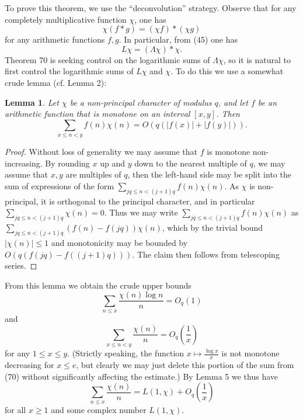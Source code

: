 \documentclass[10pt,reqno]{amsart}
\newtheorem{lemma}[theorem]{Lemma}
\begin{document}
To prove this theorem, we use the “deconvolution” strategy. Observe that for any completely multiplicative function $\chi$, one has
%
\[  \chi(f*g) = (\chi f) * (\chi g)\]
%
for any arithmetic functions $f, g$. In particular, from (45) one has
%
\begin{equation}   L\chi = (\Lambda \chi) * \chi. \end{equation}
%
Theorem 70 is seeking control on the logarithmic sums of $\Lambda \chi$, so it is natural to first control the logarithmic sums of $L\chi$ and $\chi$. To do this we use a somewhat crude lemma (cf. Lemma 2):

\begin{lemma}
    Let $\chi$ be a non-principal character of modulus $q$, and let $f$ be an arithmetic function that is monotone on an interval $[x,y]$. Then
    \[  \sum_{x \leq n < y} f(n) \chi(n) = O( q(|f(x)| + |f(y)|) ).\]
\end{lemma}
\begin{proof}
    Without loss of generality we may assume that $f$ is monotone non-increasing. By rounding $x$ up and $y$ down to the nearest multiple of $q$, we may assume that $x, y$ are multiples of $q$, then the left-hand side may be split into the sum of expressions of the form $\sum_{jq \leq n < (j+1)q} f(n) \chi(n)$. As $\chi$ is non-principal, it is orthogonal to the principal character, and in particular $\sum_{jq \leq n < (j+1) q} \chi(n) = 0$. Thus we may write $\sum_{jq \leq n < (j+1)q} f(n) \chi(n)$ as $\sum_{jq \leq n < (j+1)q} (f(n)-f(jq)) \chi(n)$, which by the trivial bound $|\chi(n)| \leq 1$ and monotonicity may be bounded by $O( q(f(jq) - f((j+1)q)) )$. The claim then follows from telescoping series. %
\end{proof}

From this lemma we obtain the crude upper bounds
%
\begin{equation}   \sum_{n \leq x} \frac{\chi(n) \log n}{n} = O_q( 1 ) \end{equation}
%
and
%
\begin{equation}   \sum_{x \leq n < y} \frac{\chi(n)}{n} = O_q \left( \frac{1}{x} \right) \end{equation}
%
for any $1 \leq x \leq y$. (Strictly speaking, the function $x \mapsto \frac{\log x}{x}$ is not monotone decreasing for $x \leq e$, but clearly we may just delete this portion of the sum from (70) without significantly affecting the estimate.) By Lemma 5 we thus have
%
\begin{equation}   \sum_{n \leq x} \frac{\chi(n)}{n} = L(1,\chi) + O_q \left( \frac{1}{x} \right) \end{equation}
%
for all $x \geq 1$ and some complex number $L(1,\chi)$.
\end{document}
